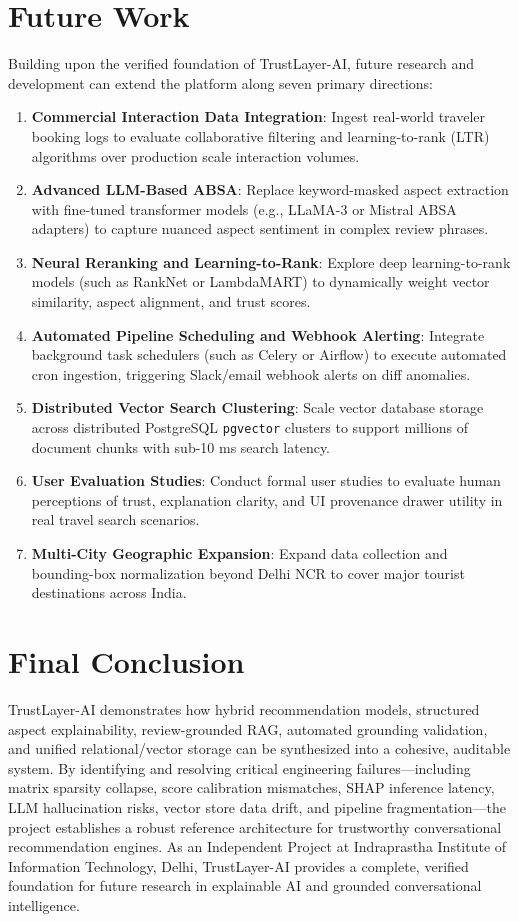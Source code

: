 \section{Future Work}
Building upon the verified foundation of TrustLayer-AI, future research and development can extend the platform along seven primary directions:
\begin{enumerate}
    \item \textbf{Commercial Interaction Data Integration}: Ingest real-world traveler booking logs to evaluate collaborative filtering and learning-to-rank (LTR) algorithms over production scale interaction volumes.
    \item \textbf{Advanced LLM-Based ABSA}: Replace keyword-masked aspect extraction with fine-tuned transformer models (e.g., LLaMA-3 or Mistral ABSA adapters) to capture nuanced aspect sentiment in complex review phrases.
    \item \textbf{Neural Reranking and Learning-to-Rank}: Explore deep learning-to-rank models (such as RankNet or LambdaMART) to dynamically weight vector similarity, aspect alignment, and trust scores.
    \item \textbf{Automated Pipeline Scheduling and Webhook Alerting}: Integrate background task schedulers (such as Celery or Airflow) to execute automated cron ingestion, triggering Slack/email webhook alerts on diff anomalies.
    \item \textbf{Distributed Vector Search Clustering}: Scale vector database storage across distributed PostgreSQL \texttt{pgvector} clusters to support millions of document chunks with sub-10 ms search latency.
    \item \textbf{User Evaluation Studies}: Conduct formal user studies to evaluate human perceptions of trust, explanation clarity, and UI provenance drawer utility in real travel search scenarios.
    \item \textbf{Multi-City Geographic Expansion}: Expand data collection and bounding-box normalization beyond Delhi NCR to cover major tourist destinations across India.
\end{enumerate}

\section{Final Conclusion}
TrustLayer-AI demonstrates how hybrid recommendation models, structured aspect explainability, review-grounded RAG, automated grounding validation, and unified relational/vector storage can be synthesized into a cohesive, auditable system. By identifying and resolving critical engineering failures—including matrix sparsity collapse, score calibration mismatches, SHAP inference latency, LLM hallucination risks, vector store data drift, and pipeline fragmentation—the project establishes a robust reference architecture for trustworthy conversational recommendation engines. As an Independent Project at Indraprastha Institute of Information Technology, Delhi, TrustLayer-AI provides a complete, verified foundation for future research in explainable AI and grounded conversational intelligence.
